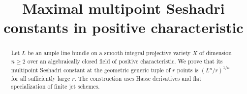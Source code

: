 \documentclass[11pt,a4paper]{amsart}
\title{Maximal multipoint Seshadri constants in positive characteristic}
\author{}
\date{}
\begin{document}
\begin{abstract}
Let $L$ be an ample line bundle on a smooth integral projective variety $X$ of dimension $n\geq2$ over an algebraically closed field of positive characteristic. We prove that its multipoint Seshadri constant at the geometric generic tuple of $r$ points is $(L^n/r)^{1/n}$ for all sufficiently large $r$. The construction uses Hasse derivatives and flat specialization of finite jet schemes.
\end{abstract}

\maketitle








\printbibliography
\end{document}
